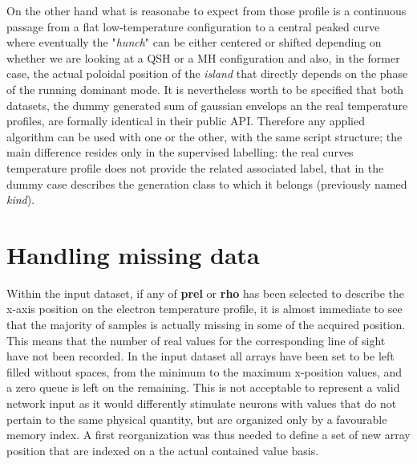 On the other hand what is reasonabe to expect from those profile is a continuous passage from a flat low-temperature configuration to a central peaked curve where eventually the "\textit{hunch}" can be either centered or shifted depending on whether we are looking at a QSH or a MH configuration and also, in the former case, the actual poloidal position of the \textit{island} that directly depends on the phase of the running dominant mode.
It is nevertheless worth to be specified that both datasets, the dummy generated sum of gaussian envelops an the real temperature profiles, are formally identical in their public API. Therefore  any applied algorithm can be used with one or the other, with the same script structure; the main difference resides only in the supervised labelling: the real curves temperature profile does not provide the related associated label, that in the dummy case describes the generation class to which it belongs (previously named \textit{kind}).





\section{Handling missing data}

Within the input dataset, if any of \textbf{prel} or \textbf{rho} has been selected to describe the x-axis position on the electron temperature profile, it is almost immediate to see that the majority of samples is actually missing in some of the acquired position. This means that the number of real values for the corresponding line of sight have not been recorded. 
In the input dataset all arrays have been set to be left filled without spaces, from the minimum to the maximum x-position values, and a zero queue is left on the remaining. This is not acceptable to represent a valid network input as it would differently stimulate neurons with values that do not pertain to the same physical quantity, but are organized only by a favourable memory index.
A first reorganization was thus needed to define a set of new array position that are indexed on a the actual contained value basis.


